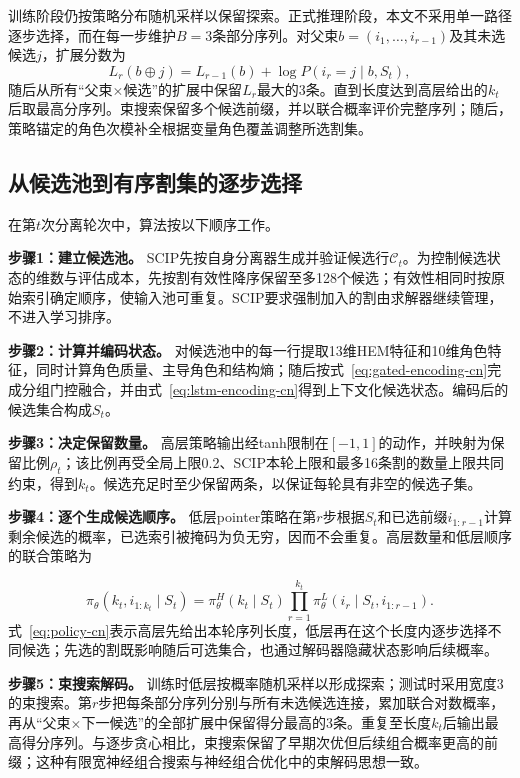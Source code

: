 \documentclass[journal]{IEEEtran}
\begin{document}
训练阶段仍按策略分布随机采样以保留探索。正式推理阶段，本文不采用单一路径逐步选择，而在每一步维护$B=3$条部分序列。对父束$b=(i_1,\ldots,i_{r-1})$及其未选候选$j$，扩展分数为
\begin{equation}
L_r(b\oplus j)=L_{r-1}(b)+\log P(i_r=j\mid b,S_t),
\label{eq:beam-score-cn}
\end{equation}
随后从所有“父束$\times$候选”的扩展中保留$L_r$最大的3条。直到长度达到高层给出的$k_t$后取最高分序列。束搜索保留多个候选前缀，并以联合概率评价完整序列；随后，策略锚定的角色次模补全根据变量角色覆盖调整所选割集。

\subsection{从候选池到有序割集的逐步选择}

在第$t$次分离轮次中，算法按以下顺序工作。

\noindent\textbf{步骤1：建立候选池。} SCIP先按自身分离器生成并验证候选行$\mathcal C_t$。为控制候选状态的维数与评估成本，先按割有效性降序保留至多128个候选；有效性相同时按原始索引确定顺序，使输入池可重复。SCIP要求强制加入的割由求解器继续管理，不进入学习排序。

\noindent\textbf{步骤2：计算并编码状态。} 对候选池中的每一行提取13维HEM特征和10维角色特征，同时计算角色质量、主导角色和结构熵；随后按式~\eqref{eq:gated-encoding-cn}完成分组门控融合，并由式~\eqref{eq:lstm-encoding-cn}得到上下文化候选状态。编码后的候选集合构成$S_t$。

\noindent\textbf{步骤3：决定保留数量。} 高层策略输出经tanh限制在$[-1,1]$的动作，并映射为保留比例$\rho_t$；该比例再受全局上限0.2、SCIP本轮上限和最多16条割的数量上限共同约束，得到$k_t$。候选充足时至少保留两条，以保证每轮具有非空的候选子集。

\noindent\textbf{步骤4：逐个生成候选顺序。} 低层pointer策略在第$r$步根据$S_t$和已选前缀$i_{1:r-1}$计算剩余候选的概率，已选索引被掩码为负无穷，因而不会重复。高层数量和低层顺序的联合策略为

\begin{equation}
\pi_\theta(k_t,i_{1:k_t}\mid S_t)=\pi_\theta^H(k_t\mid S_t)
\prod_{r=1}^{k_t}\pi_\theta^L(i_r\mid S_t,i_{1:r-1}).
\label{eq:policy-cn}
\end{equation}
式~\eqref{eq:policy-cn}表示高层先给出本轮序列长度，低层再在这个长度内逐步选择不同候选；先选的割既影响随后可选集合，也通过解码器隐藏状态影响后续概率。

\noindent\textbf{步骤5：束搜索解码。} 训练时低层按概率随机采样以形成探索；测试时采用宽度3的束搜索。第$r$步把每条部分序列分别与所有未选候选连接，累加联合对数概率，再从“父束$\times$下一候选”的全部扩展中保留得分最高的3条。重复至长度$k_t$后输出最高得分序列。与逐步贪心相比，束搜索保留了早期次优但后续组合概率更高的前缀；这种有限宽神经组合搜索与神经组合优化中的束解码思想一致\cite{choo2022beam}。
\end{document}
